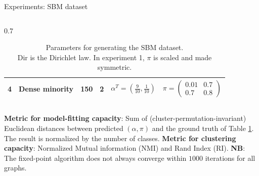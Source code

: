 \documentclass[final]{beamer}
\newlength{\colwidth}
\begin{document}
\begin{frame}[t]
\begin{columns}[t]
\begin{column}{\colwidth}
\begin{block}{Experiments: SBM dataset}
\begin{column}{0.7\colwidth}
\begin{table}[ht]
\begin{tabular}{@{}cccccc@{}}
              4                                       & \multicolumn{1}{c|}{Dense minority}           & \hspace{1em} 150                        & \multicolumn{1}{c|}{2} & $\alpha^T = (\frac{9}{10}, \frac{1}{10})$ & $\pi = \begin{pmatrix} 0.01 & 0.7 \\ 0.7 & 0.8 \end{pmatrix}$ \\ \bottomrule
            \end{tabular}
            \caption{\centering Parameters for generating the SBM dataset. \\ $\text{Dir}$ is the Dirichlet law. In experiment 1, $\pi$ is scaled and made symmetric.}
            \label{tab:sbm_parameters}
          \end{table}
        \end{column}
        \textcolor{nottblue}{}
        \textbf{Metric for model-fitting capacity}: Sum of (cluster-permutation-invariant) Euclidean distances between predicted $(\alpha, \pi)$ and the ground truth of Table \ref{tab:sbm_parameters}. The result is normalized by the number of classes.
        \newline
        \textcolor{nottblue}{}
        \textbf{Metric for clustering capacity}: Normalized Mutual information (NMI) and Rand Index (RI).\newline
        \textbf{NB}: The fixed-point algorithm does not always converge within $1000$ iterations for all graphs.


\end{block}
\end{column}
\end{columns}
\end{frame}
\end{document}
